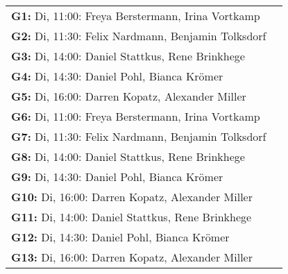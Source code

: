 \documentclass[a4paper, 10pt, landscape]{scrartcl}
\begin{document}
\begin{longtable}{l l }
\textbf{G1: }Di, 11:00: Freya Berstermann, Irina Vortkamp\\\textbf{G2: }Di, 11:30: Felix Nardmann, Benjamin Tolksdorf\\
\textbf{G3: }Di, 14:00: Daniel Stattkus, Rene Brinkhege\\\textbf{G4: }Di, 14:30: Daniel Pohl, Bianca Krömer\\
\textbf{G5: }Di, 16:00: Darren Kopatz, Alexander Miller\\\textbf{G6: }Di, 11:00: Freya Berstermann, Irina Vortkamp\\
\textbf{G7: }Di, 11:30: Felix Nardmann, Benjamin Tolksdorf\\\textbf{G8: }Di, 14:00: Daniel Stattkus, Rene Brinkhege\\
\textbf{G9: }Di, 14:30: Daniel Pohl, Bianca Krömer\\\textbf{G10: }Di, 16:00: Darren Kopatz, Alexander Miller\\
\textbf{G11: }Di, 14:00: Daniel Stattkus, Rene Brinkhege\\\textbf{G12: }Di, 14:30: Daniel Pohl, Bianca Krömer\\
\textbf{G13: }Di, 16:00: Darren Kopatz, Alexander Miller\\
\end{longtable}
  
\end{document}

